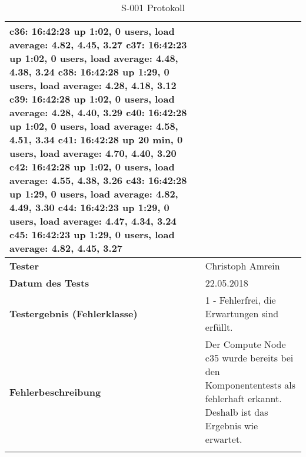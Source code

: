 \begin{longtable}{p{4.5cm}p{11.5cm}}
c36:  16:42:23 up  1:02,  0 users,  load average: 4.82, 4.45, 3.27 \newline
c37:  16:42:23 up  1:02,  0 users,  load average: 4.48, 4.38, 3.24 \newline
c38:  16:42:28 up  1:29,  0 users,  load average: 4.28, 4.18, 3.12 \newline
c39:  16:42:28 up  1:02,  0 users,  load average: 4.28, 4.40, 3.29 \newline
c40:  16:42:28 up  1:02,  0 users,  load average: 4.58, 4.51, 3.34 \newline
c41:  16:42:28 up 20 min,  0 users,  load average: 4.70, 4.40, 3.20 \newline
c42:  16:42:28 up  1:02,  0 users,  load average: 4.55, 4.38, 3.26 \newline
c43:  16:42:28 up  1:29,  0 users,  load average: 4.82, 4.49, 3.30 \newline
c44:  16:42:23 up  1:29,  0 users,  load average: 4.47, 4.34, 3.24 \newline
c45:  16:42:23 up  1:29,  0 users,  load average: 4.82, 4.45, 3.27 
\\\hline
\cellcolor{heading}\textbf{Tester} & Christoph Amrein  \\\hline
\cellcolor{heading}\textbf{Datum des Tests} & 22.05.2018  \\\hline
\cellcolor{heading}\textbf{Testergebnis \newline (Fehlerklasse)} & 1 - Fehlerfrei, die Erwartungen sind erfüllt. \\\hline
\cellcolor{heading}\textbf{Fehlerbeschreibung} & Der Compute Node c35 wurde bereits bei den Komponententests als fehlerhaft erkannt. Deshalb ist das Ergebnis wie erwartet.  \\\hline
\caption{S-001 Protokoll}
\end{longtable}

